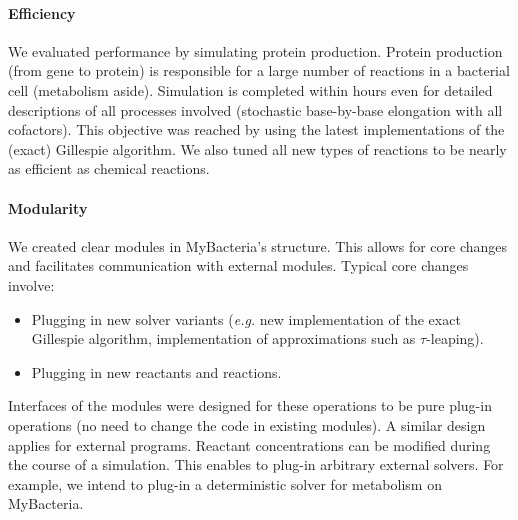 \paragraph{Efficiency}
We evaluated performance by simulating protein production.
Protein production (from gene to protein) is responsible for
a large number of reactions in a bacterial cell (metabolism aside).
Simulation is completed within hours even for detailed descriptions of all
processes involved (stochastic base-by-base elongation with all cofactors).
This objective was reached by using the latest implementations
of the (exact) Gillespie algorithm.
We also tuned all new types of reactions to be nearly as efficient as chemical
reactions.

\paragraph{Modularity}
We created clear modules in MyBacteria's structure.
This allows for core changes and facilitates communication with external modules.
Typical core changes involve:
\begin{itemize}
  \item Plugging in new solver variants
  (\textit{e.g.} new implementation of the  exact Gillespie algorithm,
  implementation of approximations such as $\tau$-leaping).
  \item Plugging in new reactants and reactions.
\end{itemize}
Interfaces of the modules were designed for these operations to be pure
plug-in operations (no need to change the code in existing modules).
A similar design applies for external programs.
Reactant concentrations can be modified during the course of a simulation.
This enables to plug-in arbitrary external solvers.
For example, we intend to plug-in a deterministic solver for metabolism on
MyBacteria.
